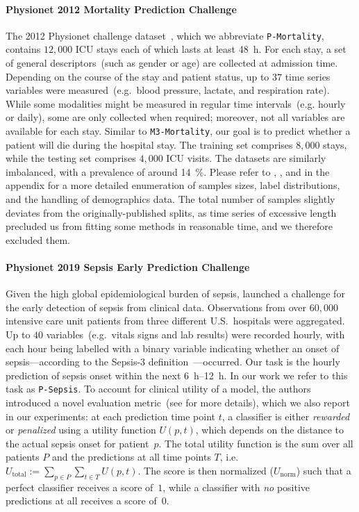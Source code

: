 \documentclass{article}
\newcommand{\dataset}[1]{\texttt{#1}}
\begin{document}
\paragraph{Physionet 2012 Mortality Prediction Challenge}
The 2012 Physionet challenge dataset~\citep{goldberger2000physiobank},
which we abbreviate \dataset{P-Mortality}, contains $12,000$ ICU stays
each of which lasts at least \SI{48}{\hour}.
For each stay, a set of general descriptors~(such as gender or age)
are collected at admission time.
Depending on the course of the stay and patient status, up to $37$ time series
variables were measured~(e.g.\ blood pressure, lactate, and respiration
rate).
While some modalities might be measured in regular time intervals~(e.g.
hourly or daily), some are only collected when required; moreover, not
all variables are available for each stay. 
Similar to \dataset{M3-Mortality}, our goal is to predict whether a patient
will die during the hospital stay. 
The training set comprises $8,000$ stays, while the testing set
comprises $4,000$ ICU visits.
The datasets are similarly imbalanced, with a prevalence of around
\SI{14}{\percent}.
Please refer to , , and  in the
appendix for a more detailed enumeration of samples sizes, label
distributions, and the handling of demographics data.
The total number of samples slightly deviates from the
originally-published splits, as time series of excessive length
precluded us from fitting some methods in reasonable time, and we therefore
excluded them.

\paragraph{Physionet 2019 Sepsis Early Prediction Challenge}
Given the high global epidemiological burden of sepsis,
\citet{reyna2020early} launched a challenge for the early detection of
sepsis from clinical data. Observations from over $60,000$ intensive
care unit patients from three different U.S.\ hospitals
were aggregated. Up to $40$ variables~(e.g.\ vitals signs and lab results)
were recorded hourly, with each hour being labelled with a binary
variable indicating whether an onset of sepsis---according to the
\mbox{Sepsis-3} definition~\citep{seymour2016assessment}---occurred.
Our task is the hourly prediction of sepsis onset within the next
\SIrange{6}{12}{\hour}. In our work we refer to this task as \dataset{P-Sepsis}.
To account for clinical utility of a model, the authors introduced a novel evaluation 
metric~(see \citet{reyna2020early} for more details), which we also
report in our experiments: at each prediction time point $t$, a classifier 
is either \emph{rewarded} or \emph{penalized} using a utility function
$U(p,t)$, which depends on the 
distance to the actual sepsis onset for patient~$p$. The total utility function is the sum over 
all patients $P$ and the predictions at all time points $T$, i.e.\
$U_{\text{total}} := \sum_{p \in P}\sum_{t \in T}U(p,t)$.
The score is then normalized ($U_{\text{norm}}$) such that a perfect classifier receives
a score of~$1$, while a classifier with \emph{no} positive predictions
at all receives a score of~$0$.
\end{document}
